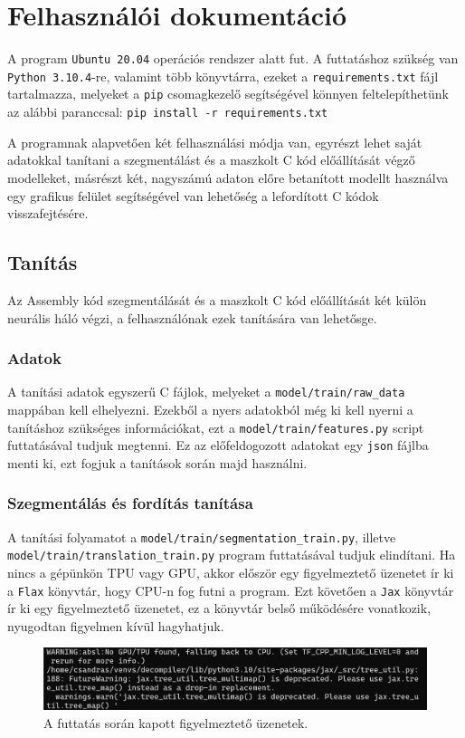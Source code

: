 \chapter{Felhasználói dokumentáció}
\label{ch:user}

A program \texttt{Ubuntu 20.04} operációs rendszer alatt fut.
A futtatáshoz szükség van \texttt{Python 3.10.4}-re, valamint több könyvtárra,
ezeket a \texttt{requirements.txt} fájl tartalmazza, melyeket a
\texttt{pip} csomagkezelő segítségével könnyen feltelepíthetünk az alábbi
paranccsal: \texttt{pip install -r requirements.txt}

A programnak alapvetően két felhasználási módja van, egyrészt lehet saját
adatokkal tanítani a szegmentálást és a maszkolt C kód előállítását végző
modelleket, másrészt két, nagyszámú adaton előre betanított modellt használva
egy grafikus felület segítségével van lehetőség a lefordított C kódok
visszafejtésére.

\section{Tanítás}
Az Assembly kód szegmentálását és a maszkolt C kód előállítását két külön
neurális háló végzi, a felhasználónak ezek tanítására van lehetősge.
\subsection{Adatok}
A tanítási adatok egyszerű C fájlok, melyeket a \texttt{model/train/raw\_data}
mappában kell elhelyezni. Ezekből a nyers adatokból még ki kell nyerni
a tanításhoz szükséges információkat, ezt a \texttt{model/train/features.py}
script futtatásával tudjuk megtenni. Ez az előfeldogozott adatokat egy
\texttt{json} fájlba menti ki, ezt fogjuk a tanítások során majd használni.

\subsection{Szegmentálás és fordítás tanítása}
A tanítási folyamatot a \texttt{model/train/segmentation\_train.py}, illetve
\texttt{model/train/translation\_train.py} program
futtatásával tudjuk elindítani. Ha nincs a gépünkön TPU vagy GPU, akkor először
egy figyelmeztető üzenetet ír ki a \texttt{Flax} könyvtár, hogy CPU-n fog futni
a program. Ezt követően a \texttt{Jax} könyvtár ír ki egy figyelmeztető
üzenetet, ez a könyvtár belső működésére vonatkozik, nyugodtan figyelmen kívül
hagyhatjuk.

\begin{figure}[H]
	\centering
	\includegraphics[width=1.0\textwidth]{images/warnings.png}
	\caption{A futtatás során kapott figyelmeztető üzenetek.}
	\label{fig:warnings}
\end{figure}

